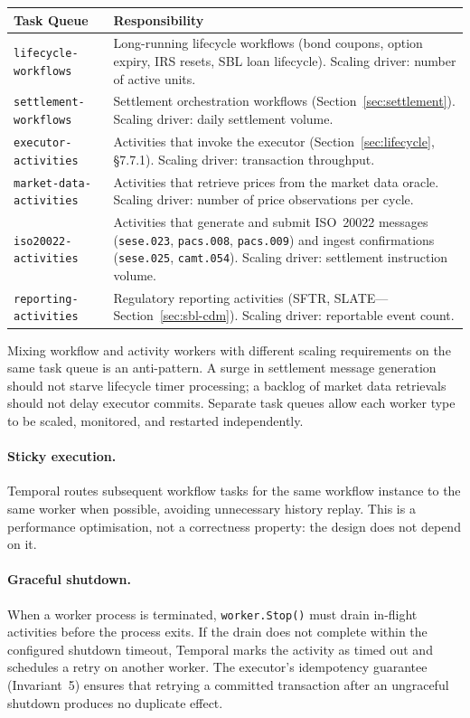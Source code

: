 \documentclass[11pt,a4paper]{article}
\begin{document}
\begin{center}
\small
\begin{tabular}{l p{7.5cm}}
\toprule
\textbf{Task Queue} & \textbf{Responsibility} \\
\midrule
\texttt{lifecycle-workflows} &
  Long-running lifecycle workflows (bond coupons, option expiry,
  IRS resets, SBL loan lifecycle).
  Scaling driver: number of active units. \\
\texttt{settlement-workflows} &
  Settlement orchestration workflows
  (Section~\ref{sec:settlement}).
  Scaling driver: daily settlement volume. \\
\texttt{executor-activities} &
  Activities that invoke the executor
  (Section~\ref{sec:lifecycle}, \S7.7.1).
  Scaling driver: transaction throughput. \\
\texttt{market-data-activities} &
  Activities that retrieve prices from the market data oracle.
  Scaling driver: number of price observations per cycle. \\
\texttt{iso20022-activities} &
  Activities that generate and submit ISO~20022 messages
  (\texttt{sese.023}, \texttt{pacs.008}, \texttt{pacs.009})
  and ingest confirmations
  (\texttt{sese.025}, \texttt{camt.054}).
  Scaling driver: settlement instruction volume. \\
\texttt{reporting-activities} &
  Regulatory reporting activities (SFTR, SLATE---Section~\ref{sec:sbl-cdm}).
  Scaling driver: reportable event count. \\
\bottomrule
\end{tabular}
\end{center}

\noindent Mixing workflow and activity workers with different scaling requirements on the same task queue is an anti-pattern. A surge in settlement message generation should not starve lifecycle timer processing; a backlog of market data retrievals should not delay executor commits. Separate task queues allow each worker type to be scaled, monitored, and restarted independently.

\paragraph{Sticky execution.}
Temporal routes subsequent workflow tasks for the same workflow instance to the same worker when possible, avoiding unnecessary history replay. This is a performance optimisation, not a correctness property: the design does not depend on it.

\paragraph{Graceful shutdown.}
When a worker process is terminated, \texttt{worker.Stop()} must drain in-flight activities before the process exits. If the drain does not complete within the configured shutdown timeout, Temporal marks the activity as timed out and schedules a retry on another worker. The executor's idempotency guarantee (Invariant~5) ensures that retrying a committed transaction after an ungraceful shutdown produces no duplicate effect.
\end{document}
